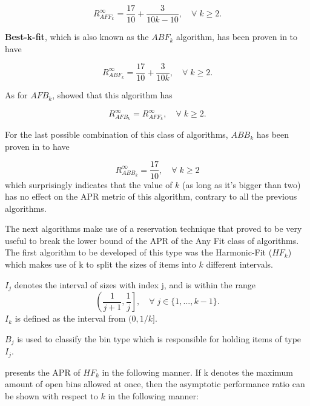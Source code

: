 \begin{equation}
    R_{AFF_k}^\infty = \frac{17}{10} + \frac{3}{10k - 10}, \quad \forall \; k \geq 2.
\end{equation}

\textbf{Best-k-fit}, which is also known as the $ABF_k$ algorithm, has been proven in \cite{mao1993besk} to have

\begin{equation}
    R_{ABF_k}^\infty = \frac{17}{10} + \frac{3}{10k}, \quad  \forall \; k \geq 2.
\end{equation}

As for $AFB_k$, \cite{zhang1994tight} showed that this algorithm has

\begin{equation}
    R_{AFB_k}^\infty = R_{AFF_k}^\infty, \quad  \forall \; k \geq 2.
\end{equation}

For the last possible combination of this class of algorithms, $ABB_k$ has been proven in \cite{csirik2001bounded} to have 

\begin{equation}
    R_{ABB_k}^\infty = \frac{17}{10},  \quad \forall \; k \geq 2
\end{equation}
which surprisingly indicates that the value of $k$ (as long as it's bigger than two) has no effect on the APR metric of this algorithm, contrary to all the previous algorithms.

The next algorithms make use of a reservation technique that proved to be very useful to break the lower bound of the APR of the Any Fit class of algorithms. The first algorithm to be developed of this type was the Harmonic-Fit ($HF_k$) which makes use of k to split the sizes of items into $k$ different intervals.

$I_j$ denotes the interval of sizes with index j, and is within the range 
\begin{equation}
    \left (\frac{1}{j+1}, \frac{1}{j} \right], \quad \forall \; j \in \{1, ..., k-1\}.
\end{equation}
$I_k$ is defined as the interval from $(0, 1/k]$.

$B_j$ is used to classify the bin type which is responsible for holding items of type $I_j$.

\cite{lee1985simple} presents the APR of $HF_k$ in the following manner. If k denotes the maximum amount of open bins allowed at once, then the asymptotic performance ratio can be shown with respect to $k$ in the following manner:

